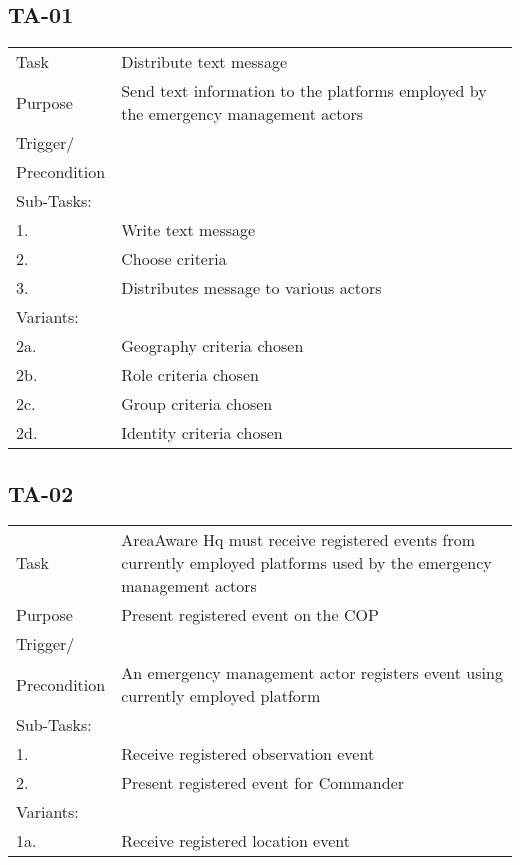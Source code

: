 \subsection{TA-01}
\begin{longtable}{| p{2.5cm}  | p{10cm} |  }
	\hline
	Task & Distribute text message \\
	Purpose & Send text information to the platforms employed by the emergency management actors \\
	Trigger/ &  \\ Precondition &  \\
	\hline
	Sub-Tasks: & \\
	1. & Write text message\\
	2. & Choose criteria \\
	3. & Distributes message to various actors \\
	\hline
	Variants: & \\
	2a. & Geography criteria chosen \\
	2b. & Role criteria chosen\\
	2c. & Group criteria chosen\\
	2d. & Identity criteria chosen\\
	\hline
\end{longtable}



\subsection{TA-02}
\begin{longtable}{| p{2.5cm}  | p{10cm} |  }
	\hline
	Task & AreaAware Hq must receive registered events from currently employed platforms used by the emergency management actors  \\
	Purpose & Present registered event on the COP \\
	Trigger/ &  \\Precondition & An emergency management actor registers event using currently employed platform \\
	\hline
	Sub-Tasks: & \\
	1. & Receive registered observation event \\
	2. & Present registered event for Commander \\
	\hline
	Variants: & \\
	1a. & Receive registered location event \\
	\hline
\end{longtable}

